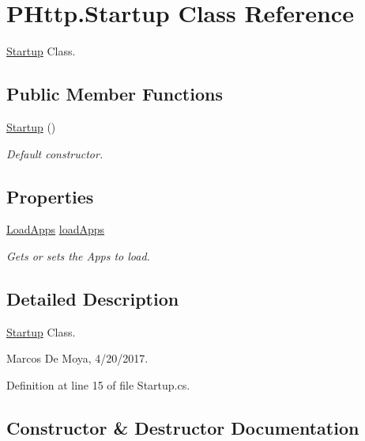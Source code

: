 \hypertarget{class_p_http_1_1_startup}{}\section{P\+Http.\+Startup Class Reference}
\label{class_p_http_1_1_startup}


\hyperlink{class_p_http_1_1_startup}{Startup} Class.  


\subsection*{Public Member Functions}
\begin{DoxyCompactItemize}
\item 
\hyperlink{class_p_http_1_1_startup_a63b26e5469bbe84e46ae0c564a1ffa21}{Startup} ()
\begin{DoxyCompactList}\small\item\em Default constructor. \end{DoxyCompactList}\end{DoxyCompactItemize}
\subsection*{Properties}
\begin{DoxyCompactItemize}
\item 
\hyperlink{class_p_http_1_1_load_apps}{Load\+Apps} \hyperlink{class_p_http_1_1_startup_a62c512ed62528faa23f3f504032b5eb5}{load\+Apps}
\begin{DoxyCompactList}\small\item\em Gets or sets the Apps to load. \end{DoxyCompactList}\end{DoxyCompactItemize}


\subsection{Detailed Description}
\hyperlink{class_p_http_1_1_startup}{Startup} Class. 

Marcos De Moya, 4/20/2017. 

Definition at line 15 of file Startup.\+cs.



\subsection{Constructor \& Destructor Documentation}
\mbox{\label{class_p_http_1_1_startup_a63b26e5469bbe84e46ae0c564a1ffa21}} 
